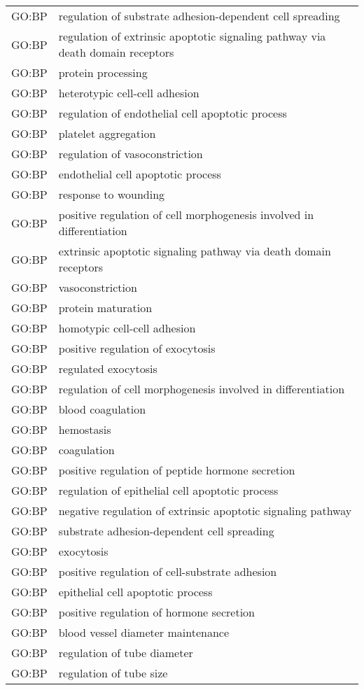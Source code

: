 \begin{longtable}{lp{12cm}}
GO:BP & regulation of substrate adhesion-dependent cell spreading\\
GO:BP & regulation of extrinsic apoptotic signaling pathway via death domain receptors\\
GO:BP & protein processing\\
GO:BP & heterotypic cell-cell adhesion\\
GO:BP & regulation of endothelial cell apoptotic process\\
GO:BP & platelet aggregation\\
GO:BP & regulation of vasoconstriction\\
GO:BP & endothelial cell apoptotic process\\
GO:BP & response to wounding\\
GO:BP & positive regulation of cell morphogenesis involved in differentiation\\
GO:BP & extrinsic apoptotic signaling pathway via death domain receptors\\
GO:BP & vasoconstriction\\
GO:BP & protein maturation\\
GO:BP & homotypic cell-cell adhesion\\
GO:BP & positive regulation of exocytosis\\
GO:BP & regulated exocytosis\\
GO:BP & regulation of cell morphogenesis involved in differentiation\\
GO:BP & blood coagulation\\
GO:BP & hemostasis\\
GO:BP & coagulation\\
GO:BP & positive regulation of peptide hormone secretion\\
GO:BP & regulation of epithelial cell apoptotic process\\
GO:BP & negative regulation of extrinsic apoptotic signaling pathway\\
GO:BP & substrate adhesion-dependent cell spreading\\
GO:BP & exocytosis\\
GO:BP & positive regulation of cell-substrate adhesion\\
GO:BP & epithelial cell apoptotic process\\
GO:BP & positive regulation of hormone secretion\\
GO:BP & blood vessel diameter maintenance\\
GO:BP & regulation of tube diameter\\
GO:BP & regulation of tube size\\

\end{longtable}
